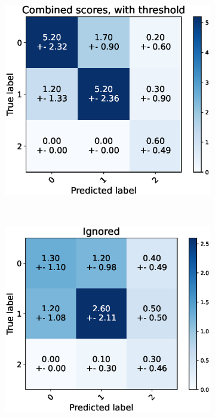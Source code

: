 \begin{figure}[h]
  \begin{subfigure}[t]{0.48\textwidth}
      \includegraphics[width=\textwidth]{files/figs/res/pelvis/cnf-combined-th.eps}
      \caption{}
      \label{fig:pelvis-cnf-comb-th}
  \end{subfigure}
  ~
  \begin{subfigure}[t]{0.48\textwidth}
      \includegraphics[width=\textwidth]{files/figs/res/pelvis/cnf-ignored.eps}

\end{subfigure}
\end{figure}
